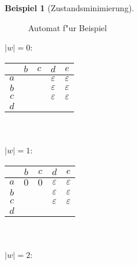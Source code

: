 \documentclass[german, 10pt, a4paper, twocolumn]{scrartcl}
\theoremstyle{definition}
\theoremstyle{example}
\newtheorem{example}{Beispiel}[subsection]
\begin{document}
\begin{example}[Zustandsminimierung]
\ \\
\begin{figure}[htb]
\begin{center}
\MediumPicture
{}
\end{center}
\caption{Automat f"ur Beispiel}
\end{figure}

$|w| = 0$:\\

\begin{tabular}{c||c|c|c|c}
	&		$b$ &		$c$ &		$d$ &			$e$ \\ \hline \hline
	$a$ &		&		&		$\varepsilon$ &		$\varepsilon$ \\ \hline
	$b$ &		&		&		$\varepsilon$ &         $\varepsilon$ \\ \hline
	$c$ &		&		&		$\varepsilon$ &         $\varepsilon$ \\ \hline
	$d$ &		&		&		&         		\\ \hline
\end{tabular}
\\\\

$|w|=1$:\\

\begin{tabular}{c||c|c|c|c}
	&		$b$ &		$c$ &		$d$ &			$e$ \\ \hline \hline
	$a$ &		$0$ &		$0$ &		$\varepsilon$ &		$\varepsilon$ \\ \hline
	$b$ &		&		&		$\varepsilon$ &         $\varepsilon$ \\ \hline
	$c$ &		&		&		$\varepsilon$ &         $\varepsilon$ \\ \hline
	$d$ &		&		&		&         		\\ \hline
\end{tabular}
\\\\

$|w|=2$:\\


\end{example}
\end{document}
